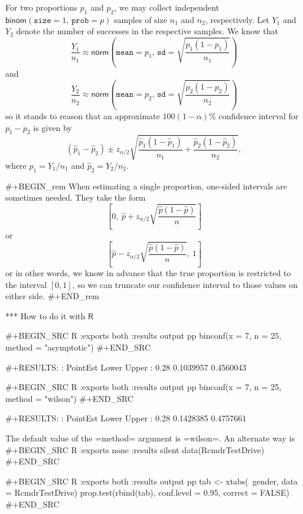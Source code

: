 For two proportions \(p_{1}\) and \(p_{2}\), we may collect
independent \(\mathsf{binom}(\mathtt{size}=1,\,\mathtt{prob}=p)\)
samples of size \(n_{1}\) and \(n_{2}\), respectively. Let \(Y_{1}\)
and \(Y_{2}\) denote the number of successes in the respective
samples.  We know that \[
\frac{Y_{1}}{n_{1}}\approx\mathsf{norm}\left(\mathtt{mean}=p_{1},\,\mathtt{sd}=\sqrt{\frac{p_{1}(1-p_{1})}{n_{1}}}\right)
\] and \[
\frac{Y_{2}}{n_{2}}\approx\mathsf{norm}\left(\mathtt{mean}=p_{2},\,\mathtt{sd}=\sqrt{\frac{p_{2}(1-p_{2})}{n_{2}}}\right)
\] so it stands to reason that an approximate \(100(1-\alpha)\%\)
confidence interval for \(p_{1}-p_{2}\) is given by
\begin{equation}
\left(\hat{p}_{1}-\hat{p}_{2}\right)\pm z_{\alpha/2}\sqrt{\frac{\hat{p}_{1}(1-\hat{p}_{1})}{n_{1}}+\frac{\hat{p}_{2}(1-\hat{p}_{2})}{n_{2}}},
\end{equation}
where \(\hat{p}_{1}=Y_{1}/n_{1}\) and \(\hat{p}_{2}=Y_{2}/n_{2}\).

#+BEGIN_rem
When estimating a single proportion, one-sided intervals are sometimes
needed. They take the form
\begin{equation}
\left[0,\ \hat{p}+z_{\alpha/2}\sqrt{\frac{\hat{p}(1-\hat{p})}{n}}\right]
\end{equation}
or
\begin{equation}
\left[\hat{p}-z_{\alpha/2}\sqrt{\frac{\hat{p}(1-\hat{p})}{n}},\ 1\right]
\end{equation}
or in other words, we know in advance that the true proportion is
restricted to the interval \([0,1]\), so we can truncate our
confidence interval to those values on either side.
#+END_rem

*** How to do it with \(\mathsf{R}\)

#+BEGIN_SRC R :exports both :results output pp 
binconf(x = 7, n = 25, method = "asymptotic")
#+END_SRC

#+RESULTS:
:  PointEst     Lower     Upper
:      0.28 0.1039957 0.4560043

#+BEGIN_SRC R :exports both :results output pp 
binconf(x = 7, n = 25, method = "wilson")
#+END_SRC

#+RESULTS:
:  PointEst     Lower     Upper
:      0.28 0.1428385 0.4757661

The default value of the =method= argument is =wilson=.  An alternate way is 
#+BEGIN_SRC R :exports none :results silent
data(RcmdrTestDrive)
#+END_SRC

#+BEGIN_SRC R :exports both :results output pp 
tab <- xtabs(~gender, data = RcmdrTestDrive)
prop.test(rbind(tab), conf.level = 0.95, correct = FALSE)
#+END_SRC

